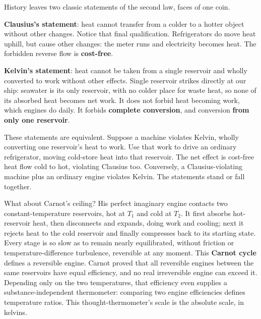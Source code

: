 
History leaves two classic statements of the second law, faces of one coin.

\textbf{Clausius's statement}: heat cannot transfer from a colder to a hotter object without other changes. Notice that final qualification. Refrigerators do move heat uphill, but cause other changes: the meter runs and electricity becomes heat. The forbidden reverse flow is \textbf{cost-free}.

\textbf{Kelvin's statement}: heat cannot be taken from a single reservoir and wholly converted to work without other effects. Single reservoir strikes directly at our ship: seawater is its only reservoir, with no colder place for waste heat, so none of its absorbed heat becomes net work. It does not forbid heat becoming work, which engines do daily. It forbids \textbf{complete conversion}, and conversion \textbf{from only one reservoir}.

These statements are equivalent. Suppose a machine violates Kelvin, wholly converting one reservoir's heat to work. Use that work to drive an ordinary refrigerator, moving cold-store heat into that reservoir. The net effect is cost-free heat flow cold to hot, violating Clausius too. Conversely, a Clausius-violating machine plus an ordinary engine violates Kelvin. The statements stand or fall together.

What about Carnot's ceiling? His perfect imaginary engine contacts two constant-temperature reservoirs, hot at \(T_1\) and cold at \(T_2\). It first absorbs hot-reservoir heat, then disconnects and expands, doing work and cooling; next it rejects heat to the cold reservoir and finally compresses back to its starting state. Every stage is so slow as to remain nearly equilibrated, without friction or temperature-difference turbulence, reversible at any moment. This \textbf{Carnot cycle} defines a reversible engine. Carnot proved that all reversible engines between the same reservoirs have equal efficiency, and no real irreversible engine can exceed it. Depending only on the two temperatures, that efficiency even supplies a substance-independent thermometer: comparing two engine efficiencies defines temperature ratios. This thought-thermometer's scale is the absolute scale, in kelvins.

